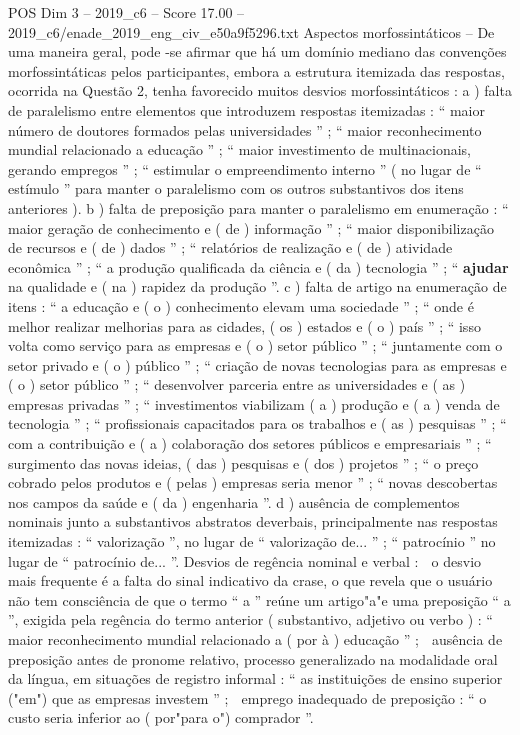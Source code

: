 \begin{textsample}{POS Dim 3 – 2019\_c6 – Score 17.00 – 2019\_c6/enade\_2019\_eng\_civ\_e50a9f5296.txt}
Aspectos morfossintáticos – De uma maneira geral, pode -se afirmar que há um domínio mediano das convenções morfossintáticas pelos participantes, embora a estrutura itemizada das respostas, ocorrida na Questão 2, tenha favorecido muitos desvios morfossintáticos : a ) falta de paralelismo entre elementos que introduzem respostas itemizadas : “ maior número de doutores formados pelas universidades ” ; “ maior reconhecimento mundial relacionado a educação ” ; “ maior investimento de multinacionais, gerando empregos ” ; “ estimular o empreendimento interno ” ( no lugar de “ estímulo ” para manter o paralelismo com os outros substantivos dos itens anteriores ). b ) falta de preposição para manter o paralelismo em enumeração : “ maior geração de conhecimento e ( de ) informação ” ; “ maior disponibilização de recursos e ( de ) dados ” ; “ relatórios de realização e ( de ) atividade econômica ” ; “ a produção qualificada da ciência e ( da ) tecnologia ” ; “ \textbf{ajudar} na qualidade e ( na ) rapidez da produção ”. c ) falta de artigo na enumeração de itens : “ a educação e ( o ) conhecimento elevam uma sociedade ” ; “ onde é melhor realizar melhorias para as cidades, ( os ) estados e ( o ) país ” ; “ isso volta como serviço para as empresas e ( o ) setor público ” ; “ juntamente com o setor privado e ( o ) público ” ; “ criação de novas tecnologias para as empresas e ( o ) setor público ” ; “ desenvolver parceria entre as universidades e ( as ) empresas privadas ” ; “ investimentos viabilizam ( a ) produção e ( a ) venda de tecnologia ” ; “ profissionais capacitados para os trabalhos e ( as ) pesquisas ” ; “ com a contribuição e ( a ) colaboração dos setores públicos e empresariais ” ; “ surgimento das novas ideias, ( das ) pesquisas e ( dos ) projetos ” ; “ o preço cobrado pelos produtos e ( pelas ) empresas seria menor ” ; “ novas descobertas nos campos da saúde e ( da ) engenharia ”. d ) ausência de complementos nominais junto a substantivos abstratos deverbais, principalmente nas respostas itemizadas : “ valorização ”, no lugar de “ valorização de... ” ; “ patrocínio ” no lugar de “ patrocínio de... ”.
Desvios de regência nominal e verbal :  o desvio mais frequente é a falta do sinal indicativo da crase, o que revela que o usuário não tem consciência de que o termo “ a ” reúne um artigo"a"e uma preposição “ a ”, exigida pela regência do termo anterior ( substantivo, adjetivo ou verbo ) : “ maior reconhecimento mundial relacionado a ( por à ) educação ” ;  ausência de preposição antes de pronome relativo, processo generalizado na modalidade oral da língua, em situações de registro informal : “ as instituições de ensino superior ("em") que as empresas investem ” ;  emprego inadequado de preposição : “ o custo seria inferior ao ( por"para o") comprador ”.

\end{textsample}
